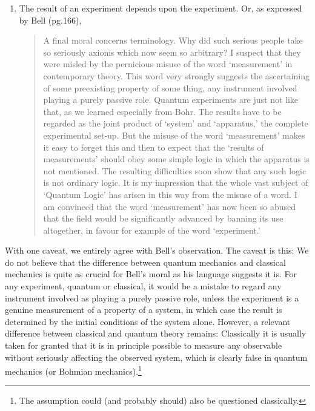 \documentclass[12pt]{article}
\newcommand{\BM}{Bohmian mechanics}
\begin{document}
\begin{enumerate}
\item The result of an experiment depends upon the experiment.  Or, as
   expressed by Bell \cite{Bel87} (pg.166),
\begin{quotation}\small\noindent
   A final moral concerns terminology. Why did such serious people take
   so seriously axioms which now seem so arbitrary? I suspect that they
   were misled by the pernicious misuse of the word `measurement' in
   contemporary theory. This word very strongly suggests the
   ascertaining of some preexisting property of some thing, any
   instrument involved playing a purely passive role. Quantum
   experiments are just not like that, as we learned especially {}from
   Bohr. The results have to be regarded as the joint product of
   `system' and `apparatus,' the complete experimental set-up. But the
   misuse of the word `measurement' makes it easy to forget this and
   then to expect that the `results of measurements' should obey some
   simple logic in which the apparatus is not mentioned. The resulting
   difficulties soon show that any such logic is not ordinary logic. It
   is my impression that the whole vast subject of `Quantum Logic' has
   arisen in this way {}from the misuse of a word. I am convinced that
   the word `measurement' has now been so abused that the field would
   be significantly advanced by banning its use altogether, in favour
   for example of the word `experiment.'
\end{quotation}
\end{enumerate}

With one caveat, we entirely agree with Bell's observation. The caveat
is this: We do not believe that the difference between quantum
mechanics and classical mechanics is quite as crucial for Bell's moral
as his language suggests it is.  For any experiment, quantum or
classical, it would be a mistake to regard any instrument involved as
playing a purely passive role, unless the experiment is a genuine
measurement of a property of a system, in which case the result is
determined by the initial conditions of the system alone. However, a
relevant difference between classical and quantum theory remains:
Classically it is usually taken for granted that it is in principle
possible to measure any observable without seriously affecting the
observed system, which is clearly false in quantum mechanics (or
\BM{}).\footnote{The assumption could (and probably should) also be
   questioned classically.}  \bigskip
\end{document}
